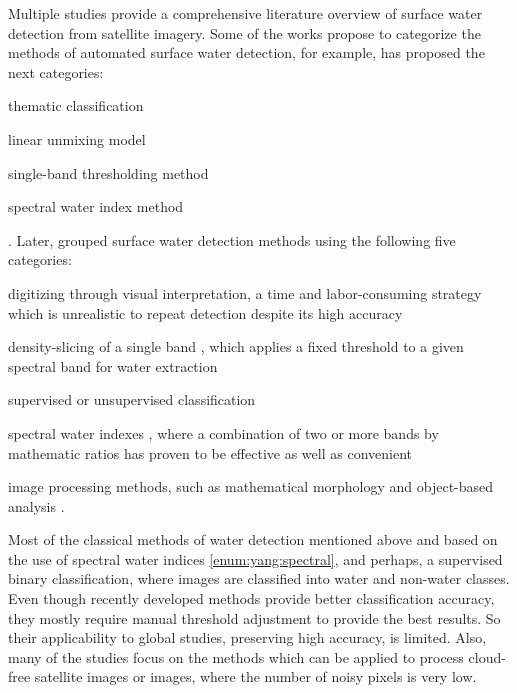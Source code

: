 Multiple studies provide a comprehensive literature overview of surface water detection from satellite imagery. Some of the works propose to categorize the methods of automated surface water detection, for example, \citep{Ji2009} has proposed the next categories:
\begin{enumerate*}[label=(\emph{\alph*})]
	\item \label {enum:ji:thematic} thematic classification \citep{lira2006segmentation}
	\item \label {enum:ji:unmixing} linear unmixing model \citep{sethre2005remote}
	\item \label {enum:ji:th} single-band thresholding method \citep{jain2005delineation}
	\item \label {enum:ji:specral} spectral water index method \citep{McFeeters1996, Xu2006, feyisa2014automated, hoberg2015conditional, fisher2016comparing}
\end{enumerate*}. Later, \citep{yang2015landsat} grouped surface water detection methods using the following five categories: 
\begin{enumerate*}[label=(\emph{\alph*})]
	\item \label {enum:yang:manual} digitizing through visual interpretation, a time and labor-consuming strategy which is unrealistic to repeat detection despite its high accuracy
	\item \label {enum:yang:single} density-slicing of a single band \citep{frazier2000water, ryu2002waterline, white1999monitoring}, which applies a fixed threshold to a given spectral band for water extraction
	\item \label {enum:yang:ml} supervised or unsupervised classification
	\item \label {enum:yang:spectral} spectral water indexes \citep{McFeeters1996, Xu2006, hoberg2015conditional, fisher2016comparing}, where a combination of two or more bands by mathematic ratios has proven to be effective as well as convenient
	\item \label {enum:yang:im} image processing methods, such as mathematical morphology and object-based analysis \citep{blaschke2010object, lira2006segmentation, yang2015landsat}.
\end{enumerate*} 

Most of the classical methods of water detection mentioned above and based on the use of spectral water indices \ref{enum:yang:spectral}, and perhaps, a supervised binary classification, where images are classified into water and non-water classes. Even though recently developed methods provide better classification accuracy, they mostly require manual threshold adjustment to provide the best results. So their applicability to global studies, preserving high accuracy, is limited. Also, many of the studies focus on the methods which can be applied to process cloud-free satellite images or images, where the number of noisy pixels is very low.

